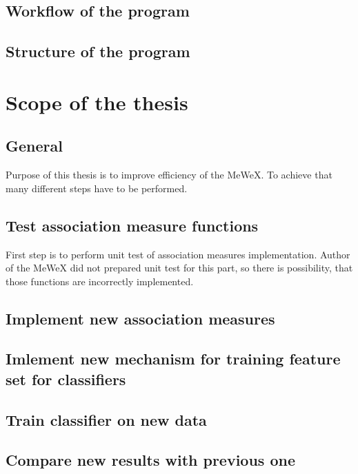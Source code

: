 \subsection{Workflow of the program}

\subsection{Structure of the program}

\section{Scope of the thesis}

\subsection{General}
Purpose of this thesis is to improve efficiency of the MeWeX. To achieve that many different steps have to be performed.

\subsection{Test association measure functions}
First step is to perform unit test of association measures implementation. Author of the MeWeX did not prepared unit test for this part, 
so there is possibility, that those functions are incorrectly implemented.

\subsection{Implement new association measures}

\subsection{Imlement new mechanism for training feature set for classifiers}

\subsection{Train classifier on new data}

\subsection{Compare new results with previous one}
